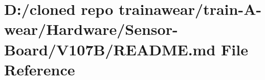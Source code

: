 \hypertarget{_hardware_2_sensor-_board_2_v107_b_2_r_e_a_d_m_e_8md}{}\section{D\+:/cloned repo trainawear/train-\/\+A-\/wear/\+Hardware/\+Sensor-\/\+Board/\+V107\+B/\+R\+E\+A\+D\+ME.md File Reference}
\label{_hardware_2_sensor-_board_2_v107_b_2_r_e_a_d_m_e_8md}
